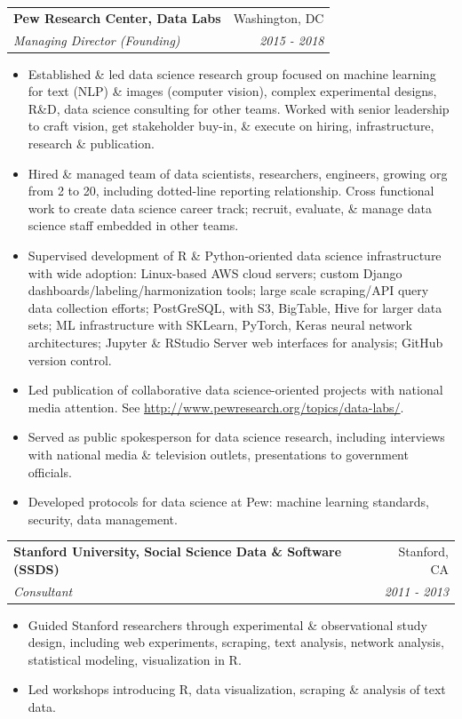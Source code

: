 \documentclass[letterpaper,11pt]{article}
\makeatletter
\newcommand{\resitem}[1]{\item #1 \vspace{-6pt}}
\newcommand{\ressubheading}[4]{\vspace{2pt}
\begin{tabular*}{7.58in}{l@{\extracolsep{\fill}}r}
		\textbf{#1} & #2 \\
		\textit{#3} & \textit{#4} \\
\end{tabular*}\vspace{-1pt}}
\makeatother
\begin{document}
\ressubheading{Pew Research Center, Data Labs}{Washington, DC}{Managing Director (Founding)}{2015 - 2018}
	\begin{itemize}
		\resitem{Established \& led data science research group focused on machine learning for text (NLP) \& images (computer vision), complex experimental designs, R\&D, data science consulting for other teams. Worked with senior leadership to craft vision, get stakeholder buy-in, \& execute on hiring, infrastructure, research \& publication.}
        \resitem{Hired \& managed team of data scientists, researchers, engineers, growing org from 2 to 20, including dotted-line reporting relationship. Cross functional work to create data science career track; recruit, evaluate, \& manage data science staff embedded in other teams.}
        \resitem{Supervised development of R \& Python-oriented data science infrastructure with wide adoption: Linux-based AWS cloud servers; custom Django dashboards/labeling/harmonization tools; large scale scraping/API query data collection efforts; PostGreSQL, with S3, BigTable, Hive for larger data sets; ML infrastructure with SKLearn, PyTorch, Keras neural network architectures; Jupyter \& RStudio Server web interfaces for analysis; GitHub version control.}
        \resitem{Led publication of collaborative data science-oriented projects with national media attention. See \url{http://www.pewresearch.org/topics/data-labs/}.}
        \resitem{Served as public spokesperson for data science research, including interviews with national media \& television outlets, presentations to government officials.}
		\resitem{Developed protocols for data science at Pew: machine learning standards, security, data management.}
	\end{itemize}


\ressubheading{Stanford University, Social Science Data \& Software (SSDS)}{Stanford, CA}{Consultant}{2011 - 2013}
	\begin{itemize}
		\resitem{Guided Stanford researchers through experimental \& observational study design, including web experiments, scraping, text analysis, network analysis, statistical modeling, visualization in R.}
		\resitem{Led workshops introducing R, data visualization, scraping \& analysis of text data.} 
	\end{itemize}
\end{document}
